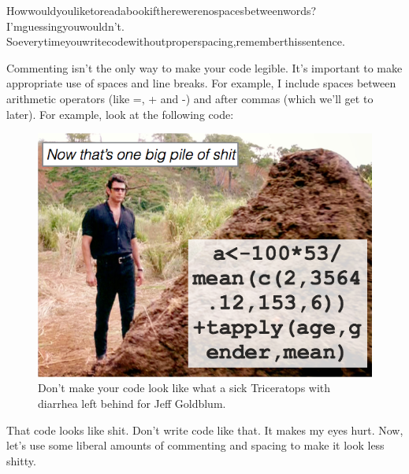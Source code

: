 \documentclass[]{book}
\newenvironment{Shaded}{\begin{snugshade}}{\end{snugshade}}
\newcommand{\KeywordTok}[1]{\textcolor[rgb]{0.13,0.29,0.53}{\textbf{#1}}}
\newcommand{\DataTypeTok}[1]{\textcolor[rgb]{0.13,0.29,0.53}{#1}}
\newcommand{\DecValTok}[1]{\textcolor[rgb]{0.00,0.00,0.81}{#1}}
\newcommand{\FloatTok}[1]{\textcolor[rgb]{0.00,0.00,0.81}{#1}}
\newcommand{\StringTok}[1]{\textcolor[rgb]{0.31,0.60,0.02}{#1}}
\newcommand{\CommentTok}[1]{\textcolor[rgb]{0.56,0.35,0.01}{\textit{#1}}}
\newcommand{\OperatorTok}[1]{\textcolor[rgb]{0.81,0.36,0.00}{\textbf{#1}}}
\newcommand{\NormalTok}[1]{#1}
\theoremstyle{definition}
\theoremstyle{definition}
\theoremstyle{remark}
\begin{document}
Howwouldyouliketoreadabookiftherewerenospacesbetweenwords?
I'mguessingyouwouldn't.
Soeverytimeyouwritecodewithoutproperspacing,rememberthissentence.

Commenting isn't the only way to make your code legible. It's important
to make appropriate use of spaces and line breaks. For example, I
include spaces between arithmetic operators (like =, + and -) and after
commas (which we'll get to later). For example, look at the following
code:

\begin{figure}

{\centering \includegraphics[width=0.5\linewidth]{images/pileofshit} 

}

\caption{Don't make your code look like what a sick Triceratops with diarrhea left behind for Jeff Goldblum.}\label{fig:pileofshit}
\end{figure}

\begin{Shaded}
\end{Shaded}

That code looks like shit. Don't write code like that. It makes my eyes
hurt. Now, let's use some liberal amounts of commenting and spacing to
make it look less shitty.
\end{document}
